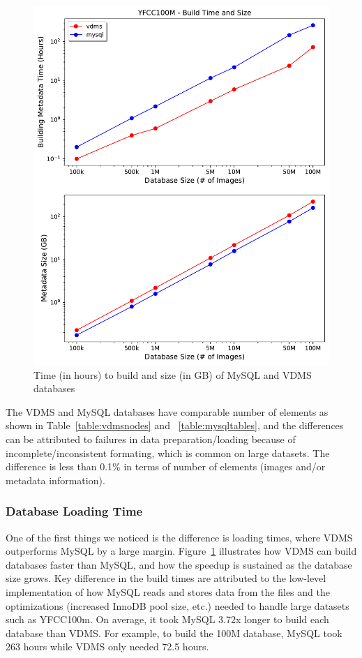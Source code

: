 \begin{figure}[]
\centering
\includegraphics[width=\columnwidth]{figures/db_time_size}
\caption{Time (in hours) to build and size (in GB) of MySQL and VDMS databases}
\label{fig:db_time_size}
\end{figure}

The VDMS and MySQL databases have comparable number of elements as shown in
Table~\ref{table:vdmsnodes} and ~\ref{table:mysqltables}, and the differences
can be attributed to failures in data preparation/loading because of
incomplete/inconsistent formating, which is common on large datasets.
The difference is less than 0.1\% in terms of number of elements (images and/or
metadata information).

\subsubsection{Database Loading Time}

One of the first things we noticed is the difference is loading times,
where VDMS outperforms MySQL by a large margin.
Figure~\ref{fig:db_time_size} illustrates how VDMS can build databases
faster than MySQL, and how the speedup is sustained as the database size grows.
Key difference in the build times are attributed to the low-level
implementation of how MySQL reads and stores data from the files and the
optimizations (increased InnoDB pool size, etc.) needed
to handle large datasets such as YFCC100m.
On average, it took MySQL 3.72x longer to build each database than VDMS.
For example, to build the 100M database, MySQL took 263 hours
while VDMS only needed 72.5 hours.

